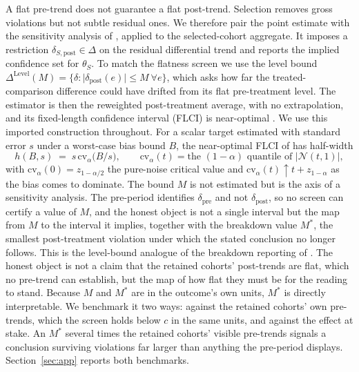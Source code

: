 \documentclass[12pt]{article}
\theoremstyle{remark}
\begin{document}
A flat pre-trend does not guarantee a flat post-trend. Selection removes gross violations but not subtle
residual ones. We therefore pair the point estimate with the sensitivity analysis of \citet{rambachan2023},
applied to the selected-cohort aggregate. It imposes a restriction $\delta_{S,\mathrm{post}}\in\Delta$ on
the residual differential trend and reports the implied confidence set for $\theta_S$. To match the
flatness screen we use the level bound
$\Delta^{\mathrm{Level}}(M)=\{\delta:\lvert\delta_{\mathrm{post}}(e)\rvert\le M\ \forall e\}$, which asks how
far the treated-comparison difference could have drifted from its flat pre-treatment level. The estimator
is then the reweighted post-treatment average, with no extrapolation, and its fixed-length confidence
interval (FLCI) is near-optimal \citep{armstrong2018}. We use this imported construction throughout. For a
scalar target estimated with standard error $s$ under a worst-case bias bound $B$, the near-optimal FLCI of
\citet{armstrong2018} has half-width
\begin{equation}\label{eq:flci-hw}
h(B,s)\;=\;s\,\mathrm{cv}_\alpha\!\big(B/s\big),\qquad
\mathrm{cv}_\alpha(t)=\text{the }(1-\alpha)\text{ quantile of }\lvert\mathcal N(t,1)\rvert,
\end{equation}
with $\mathrm{cv}_\alpha(0)=z_{1-\alpha/2}$ the pure-noise critical value and
$\mathrm{cv}_\alpha(t)\uparrow t+z_{1-\alpha}$ as the bias comes to dominate. The bound $M$ is not estimated but is the axis of a
sensitivity analysis. The pre-period identifies $\delta_{\mathrm{pre}}$ and not $\delta_{\mathrm{post}}$, so no
screen can certify a value of $M$, and the honest object is not a single interval but the map from $M$ to the
interval it implies, together with the breakdown value $M^\ast$, the smallest post-treatment violation under
which the stated conclusion no longer follows. This is the level-bound analogue of the breakdown reporting of
\citet{rambachan2023}. The honest object is not a claim that the retained cohorts' post-trends are flat, which no pre-trend can
establish, but the map of how flat they must be for the reading to stand. Because $M$ and $M^\ast$ are in
the outcome's own units, $M^\ast$ is directly interpretable. We benchmark it two ways: against the retained
cohorts' own pre-trends, which the screen holds below $c$ in the same units, and against the effect at
stake. An $M^\ast$ several times the retained cohorts' visible pre-trends signals a conclusion surviving
violations far larger than anything the pre-period displays. Section~\ref{sec:app} reports both benchmarks.
\end{document}
